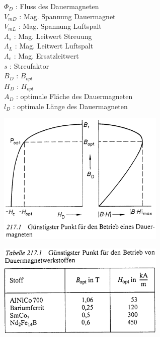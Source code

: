 \hfill
\begin{minipage}{5cm}
	$\Phi_D$ : Fluss des Dauermagneten \\
	
	$V_{mD}$ : Mag. Spannung Dauermagnet \\
	
	$V_{mL}$ : Mag. Spannung Luftspalt \\
	
	$\Lambda_s$ : Mag. Leitwert Streuung \\
	
	$\Lambda_L$ : Mag. Leitwert Luftspalt \\
	
	$\Lambda_e$ : Mag. Ersatzleitwert \\
	
	$s$ : Streufaktor \\
	
	$B_D$ : $B_{opt}$ \\
	
	$H_D$ : $H_{opt}$ \\
	
	$A_D$ : optimale Fl\"ache des Dauermagneten \\
	
	$l_D$ : optimale L\"ange des Dauermagneten
		
\end{minipage}

\begin{minipage}{8cm}
	\includegraphics[width=8cm]{./bilder/BestArbeitspunktDauermagnet.png} 
\end{minipage}	
\hfill
\begin{minipage}{8cm}
	\includegraphics[width=8cm]{./bilder/BestArbeitspunktWerkstoff.png} 
\end{minipage}	


\newpage





